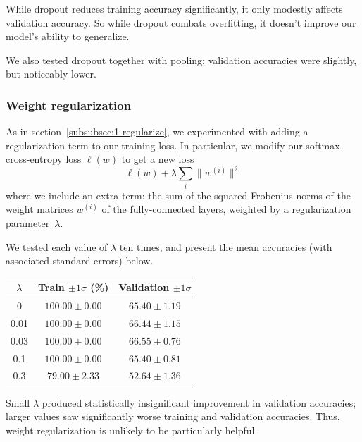 \documentclass{article}
\newcommand{\sind}[1]{^{(#1)}}
\begin{document}
\begin{multicols}{2}
While dropout reduces training accuracy significantly,
it only modestly affects validation accuracy.
So while dropout combats overfitting,
it doesn't improve our model's ability to generalize.

We also tested dropout together with pooling;
validation accuracies were slightly, but noticeably lower.


\subsubsection{Weight regularization}

As in section~\ref{subsubsec:1-regularize},
we experimented with adding a regularization term
to our training loss.
In particular, we modify our softmax cross-entropy loss $\ell(w)$
to get a new loss
\begin{equation}
    \ell(w) + \lambda\sum_i \lVert w\sind{i} \rVert^2
\end{equation}
where we include an extra term:
the sum of the squared Frobenius norms of the weight matrices $w\sind{i}$
of the fully-connected layers,
weighted by a regularization parameter~$\lambda$.

We tested each value of $\lambda$ ten times,
and present the mean accuracies (with associated standard errors) below.

\begin{center}
    \begin{tabular}{c|cc}
        $\lambda$ & Train $\pm 1 \sigma$ (\%) & Validation $\pm 1 \sigma$\\\hline
        0    & $100.00 \pm 0.00$ & $65.40 \pm 1.19$ \\
        0.01 & $100.00 \pm 0.00$ & $66.44 \pm 1.15$ \\
        0.03 & $100.00 \pm 0.00$ & $66.55 \pm 0.76$ \\
        0.1  & $100.00 \pm 0.00$ & $65.40 \pm 0.81$ \\
        0.3  &  $79.00 \pm 2.33$ & $52.64 \pm 1.36$ \\
    \end{tabular}
\end{center}
Small $\lambda$ produced
statistically insignificant improvement in validation accuracies;
larger values saw significantly worse
training and validation accuracies.
Thus, weight regularization
is unlikely to be particularly helpful.



\end{multicols}
\end{document}
